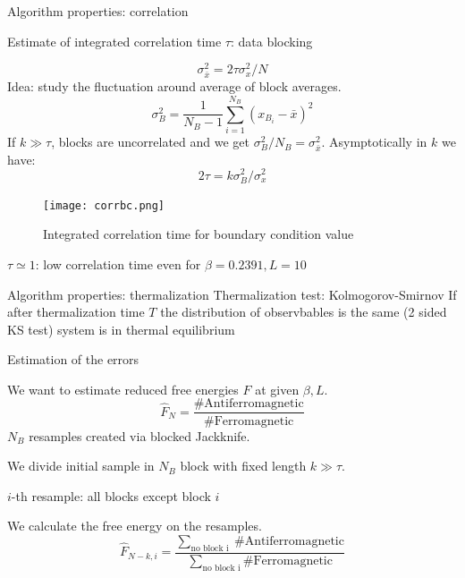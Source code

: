 \documentclass[12pt,handout]{beamer}
\begin{document}
\begin{frame}{Algorithm properties: correlation}
\begin{center}
Estimate of integrated correlation time $\tau$: data blocking

\[
	\sigma_{\bar{x}}^2 = 2\tau\sigma_{x}^2/N
\]
Idea: study the fluctuation around average of block averages.
\[
	\sigma _B ^2 = \frac{1}{N_B - 1}\sum_ {i = 1} ^{N_B} \left( x_{B_i} - \bar{x} \right)^2 
\]
If $k\gg\tau$, blocks are uncorrelated and we get $\sigma_B^2/N_B = \sigma_{\bar{x}}^2$.
Asymptotically in $k$ we have:
\[
	2\tau = k \sigma_B ^2/\sigma_{x}^2
\]
\end{center}
\end{frame}


\begin{frame}
\begin{center}
\begin{figure}
\centering
\texttt{[image: corrbc.png]}
\caption{Integrated correlation time for boundary condition value\label{fig:corr}}
\end{figure}
$\tau \simeq 1$: low correlation time even for $\beta = 0.2391, L = 10$
\end{center}
\end{frame}

\begin{frame}{Algorithm properties: thermalization}
Thermalization test: Kolmogorov-Smirnov
If after thermalization time $T$ the distribution of observbables is the same (2 sided KS test) system is in thermal equilibrium
\end{frame}

\begin{frame}{Estimation of the errors}
\begin{center}
We want to estimate reduced free energies $F$ at given $\beta, L$.
\[
	\hat{F}_N = \frac{\# \text{Antiferromagnetic}}{\# \text{Ferromagnetic}}
\]
$N_B$ resamples created via blocked Jackknife.

We divide initial sample in $N_B$ block with fixed length $k\gg \tau$.

$i$-th resample: all blocks except block $i$

We calculate the free energy on the resamples.
\[
	\hat{F}_{N-k, i} = \frac{\sum_ { \mbox{no block i }} \# \text{Antiferromagnetic} }{\sum_ {\mbox{no block i}} \# \text{Ferromagnetic}}
\]

\end{center}
\end{frame}
\end{document}
